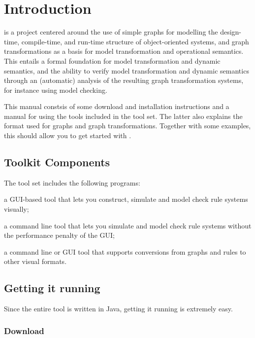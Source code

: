 \section{Introduction}

\GROOVE is a project centered around the use of simple graphs for
modelling the design-time, compile-time, and run-time structure of
object-oriented systems, and graph transformations as a basis for
model transformation and operational semantics. This entails a formal
foundation for  model transformation and dynamic semantics, and the
ability to verify model transformation and dynamic semantics through
an (automatic) analysis of the resulting graph transformation systems,
for instance using model checking.

This manual constsis of some download and installation instructions and a
manual for using the tools included in the \GROOVE tool set. The latter also
explains the format used for graphs and graph transformations. Together
with some examples, this should allow you to get started with \GROOVE.

\subsection{Toolkit Components}

The \GROOVE tool set includes the following programs:
\begin{description}\noitemsep
\item[Simulator:] a GUI-based tool that lets you construct, simulate and
  model check rule systems visually;
\item[Generator:] a command line tool that lets you simulate and model check
  rule systems without the performance penalty of the GUI;
\item[Imager:] a command line or GUI tool that supports conversions from
  \GROOVE graphs and rules to other visual formats.
\end{description}

\subsection{Getting it running}

Since the entire \GROOVE tool is written in Java, getting it running is
extremely easy.

\subsubsection{Download}

